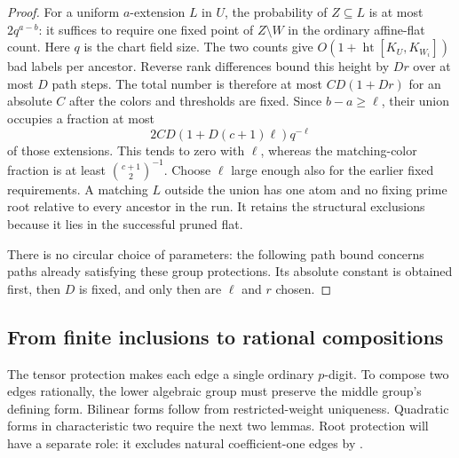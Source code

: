\begin{proof}
For a uniform $a$-extension $L$ in $U$, the probability of $Z\subseteq L$
is at most $2q^{a-b}$: it suffices to require one fixed point of
$Z\setminus W$ in the ordinary affine-flat count. Here $q$ is the chart
field size. The two counts give $O(1+\operatorname{ht}[K_U,K_{W_i}])$
bad labels per ancestor. Reverse rank differences bound this height by
$Dr$ over at most $D$ path steps. The total number is therefore at most
$CD(1+Dr)$ for an absolute $C$ after the colors and thresholds are fixed.
Since $b-a\ge\ell$, their union occupies a fraction at most
\[
 2CD(1+D(c+1)\ell)q^{-\ell}
\]
of those extensions. This tends to zero with $\ell$, whereas the
matching-color fraction is at least $\binom{c+1}{2}^{-1}$. Choose $\ell$
large enough also for the earlier fixed requirements. A matching $L$
outside the union has one atom and no fixing prime root relative to
every ancestor in the run. It retains the structural exclusions because
it lies in the successful pruned flat.

There is no circular choice of parameters: the following path bound
concerns paths already satisfying these group protections. Its absolute
constant is obtained first, then $D$ is fixed, and only then are $\ell$
and $r$ chosen.
\end{proof}

\subsection{From finite inclusions to rational compositions}

The tensor protection makes each edge a single ordinary $p$-digit.
To compose two edges rationally, the lower algebraic group must preserve
the middle group's defining form. Bilinear forms follow from
restricted-weight uniqueness. Quadratic forms in characteristic two
require the next two lemmas. Root protection will have a separate role:
it excludes natural coefficient-one edges by .

